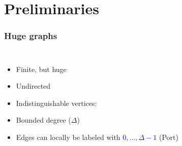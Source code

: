 \documentclass{beamer}
\begin{document}
\section{Preliminaries}
\begin{frame}
  \frametitle{Huge graphs}
  \begin{columns}
    \begin{itemize}
      \item Finite, but huge
      \item Undirected
      \item Indistinguishable vertices:
      \parbox{\baselineskip}{
        \resizebox{!}{\baselineskip}{
          \begin{tikzpicture}
            \node[node] {};
          \end{tikzpicture}
        }
      }
      \item Bounded degree ($\Delta$)
      \item Edges can locally be labeled with
        \textcolor{blue}{$0,\dots,\Delta-1$} (Port)
    \end{itemize}
    \begin{center}
      \resizebox{\textwidth}{!}{}
    \end{center}
  \end{columns}
\end{frame}
\end{document}
